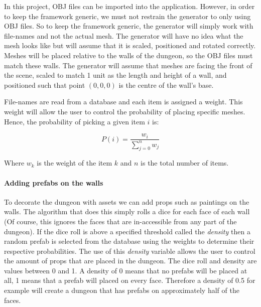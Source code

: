 In this project, OBJ files can be imported into the application. However, in order to keep the framework generic, we must not restrain the generator to only using OBJ files. So to keep the framework generic, the generator will simply work with file-names and not the actual mesh. The generator will have no idea what the mesh looks like but will assume that it is scaled, positioned and rotated correctly. Meshes will be placed relative to the walls of the dungeon, so the OBJ files must match these walls. The generator will assume that meshes are facing the front of the scene, scaled to match 1 unit as the length and height of a wall, and positioned such that point $(0,0,0)$ is the centre of the wall's base.

File-names are read from a database and each item is assigned a weight. This weight will allow the user to control the probability of placing specific meshes. Hence, the probability of picking a given item $i$ is:

$$ P(i) = \frac{w_i}{\sum\limits_{j=0}^{n} {w_j} } $$

Where $w_k$ is the weight of the item $k$ and $n$ is the total number of items.

\paragraph{Adding prefabs on the walls}
To decorate the dungeon with assets we can add props such as paintings on the walls. The algorithm that does this simply rolls a dice for each face of each wall (Of course, this ignores the faces that are in-accessible from any part of the dungeon). If the dice roll is above a specified threshold called the {\em density} then a random prefab is selected from the database using the weights to determine their respective probabilities. The use of this {\em density} variable allows the user to control the amount of props that are placed in the dungeon. The dice roll and density are values between 0 and 1. A density of 0 means that no prefabs will be placed at all, 1 means that a prefab will placed on every face. Therefore a density of 0.5 for example will create a dungeon that has prefabs on approximately half of the faces.

